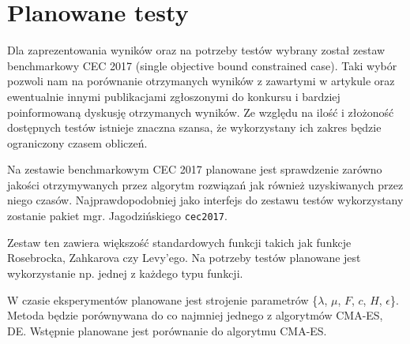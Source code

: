 \section{Planowane testy}

Dla zaprezentowania wyników oraz na potrzeby testów wybrany został zestaw benchmarkowy CEC 2017 (single objective bound constrained case). Taki wybór pozwoli nam na porównanie otrzymanych wyników z zawartymi w artykule oraz ewentualnie innymi publikacjami zgłoszonymi do konkursu i bardziej poinformowaną dyskusję otrzymanych wyników. Ze względu na ilość i złożoność dostępnych testów istnieje znaczna szansa, że wykorzystany ich zakres będzie ograniczony czasem obliczeń.

Na zestawie benchmarkowym CEC 2017 planowane jest sprawdzenie zarówno jakości otrzymywanych przez algorytm rozwiązań jak również uzyskiwanych przez niego czasów. Najprawdopodobniej jako interfejs do zestawu testów wykorzystany zostanie pakiet mgr. Jagodzińskiego \verb+cec2017+.

Zestaw ten zawiera większość standardowych funkcji takich jak funkcje Rosebrocka, Zahkarova czy Levy'ego. Na potrzeby testów planowane jest wykorzystanie np. jednej z każdego typu funkcji.

W czasie eksperymentów planowane jest strojenie parametrów \{$\lambda$, $\mu$, $F$, $c$, $H$, $\epsilon$\}. Metoda będzie porównywana do co najmniej jednego z algorytmów CMA-ES, DE. Wstępnie planowane jest porównanie do algorytmu CMA-ES.
